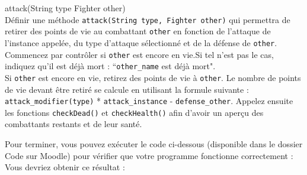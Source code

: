 \begin{Exercice}[10 minutes] attack(String type Fighter other)\\
    Définir une méthode \lstinline{attack(String type, Fighter other)} qui permettra de retirer des points de vie au combattant \lstinline{other} en fonction de l'attaque de l'instance appelée, du type d'attaque sélectionné et de la défense de \lstinline{other}. \\
    
    Commencez par contrôler si \lstinline{other} est encore en vie.Si tel n'est pas le cas, indiquez qu'il est déjà mort : ``\lstinline{other_name} est déjà mort". \\
     Si \lstinline{other} est encore en vie, retirez des points de vie à \lstinline{other}. Le nombre de points de vie devant être retiré se calcule en utilisant la formule suivante : \lstinline{attack_modifier(type)} * \lstinline{attack_instance} - \lstinline{defense_other}. Appelez ensuite les fonctions \lstinline{checkDead()} et \lstinline{checkHealth()} afin d'avoir un aperçu des combattants restants et de leur santé.
    
\begin{solution}
	
\end{solution}
\end{Exercice}
Pour terminer, vous pouvez exécuter le code ci-dessous (disponible dans le dossier Code sur Moodle) pour vérifier que votre programme fonctionne correctement : \\

Vous devriez obtenir ce résultat : \\




